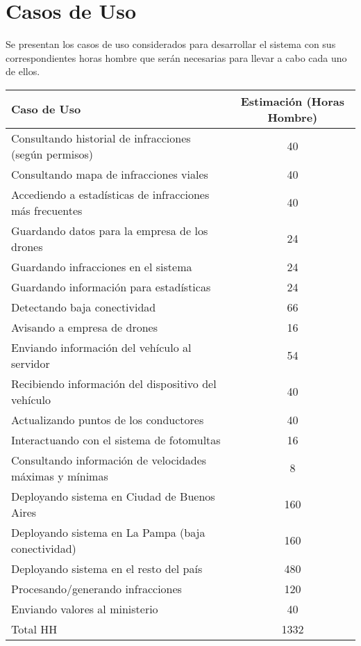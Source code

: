 \section{Casos de Uso}

Se presentan los casos de uso considerados para desarrollar el sistema
con sus correspondientes horas hombre que serán necesarias para llevar a cabo 
cada uno de ellos.


\begin{table}[htb]
\begin{center}
\begin{tabular}{|l|c|}
\hline
Caso de Uso & Estimación (Horas Hombre) \\
\hline \hline
Consultando historial de infracciones (según permisos) & 40 \\ \hline
Consultando mapa de infracciones viales & 40 \\ \hline
Accediendo a estadísticas de infracciones más frecuentes & 40 \\ \hline
Guardando datos para la empresa de los drones & 24 \\ \hline
Guardando infracciones en el sistema & 24 \\ \hline
Guardando información para estadísticas & 24 \\ \hline
Detectando baja conectividad & 66 \\ \hline
Avisando a empresa de drones & 16 \\ \hline
Enviando información del vehículo al servidor & 54 \\ \hline
Recibiendo información del dispositivo del vehículo & 40 \\ \hline
Actualizando puntos de los conductores & 40 \\ \hline
Interactuando con el sistema de fotomultas & 16 \\ \hline
Consultando información de velocidades máximas y mínimas & 8 \\ \hline
Deployando sistema en Ciudad de Buenos Aires & 160 \\ \hline
Deployando sistema en La Pampa (baja conectividad) & 160 \\ \hline
Deployando sistema en el resto del país & 480 \\ \hline
Procesando/generando infracciones & 120 \\ \hline
Enviando valores al ministerio & 40 \\ \hline \hline
Total HH & 1332 \\ \hline
\end{tabular}
\end{center}
\end{table}
